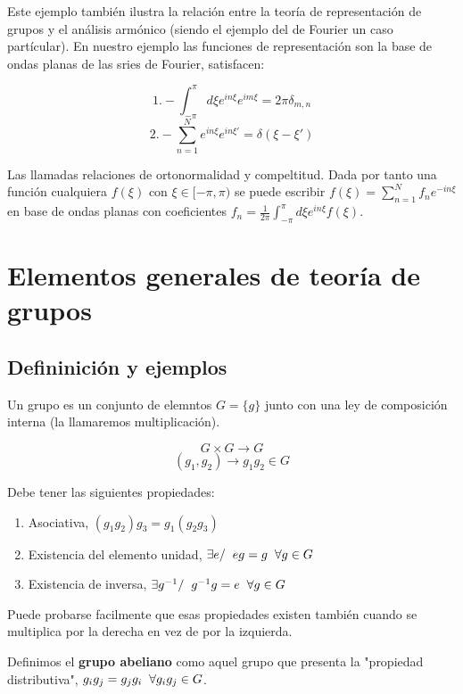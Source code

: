 \documentclass{article}
\begin{document}
\smallskip
Este ejemplo también ilustra la relación entre la teoría de representación de grupos y el análisis armónico (siendo el ejemplo del de Fourier un caso partícular). En nuestro ejemplo las funciones de representación son la base de ondas planas de las sries de Fourier, satisfacen:

$$1.- \int ^\pi _{-\pi} d\xi e^{in\xi} e^{im\xi} =2\pi \delta _{m,n}$$
$$2.- \sum _{n=1}^N e^{in\xi}e^{in\xi '}=\delta (\xi-\xi ')$$

Las llamadas relaciones de ortonormalidad y compeltitud. Dada por tanto una función cualquiera $f(\xi)$ con $\xi \in [-\pi,\pi)$ se puede escribir $f(\xi)=\sum _{n=1}^N f_ne^{-in\xi}$ en base de ondas planas con coeficientes $f_n=\frac{1}{2\pi}\int^\pi _{-\pi}d\xi e^{in\xi}f(\xi)$.






\newpage

\section{Elementos generales de teoría de grupos}
\subsection{Defininición y ejemplos}
Un grupo es un conjunto de elemntos $G=\lbrace g\rbrace$ junto con una ley de composición interna (la llamaremos multiplicación).

$$G\times G\rightarrow G$$
$$(g_1,g_2)\rightarrow g_1g_2 \in G$$

Debe tener las siguientes propiedades:

\begin{enumerate}
    \item Asociativa, $ (g_1g_2)g_3=g_1(g_2g_3)$
    \item Existencia del elemento unidad, $\exists e / \hspace{0.2cm} eg=g\hspace{0.2cm} \forall g\in G$
    \item Existencia de inversa, $\exists g^{-1} / \hspace{0.2cm} g^{-1}g=e \hspace{0.2cm} \forall g\in G$
\end{enumerate}

Puede probarse facilmente que esas propiedades existen también cuando se multiplica por la derecha en vez de por la izquierda. 

\smallskip
Definimos el \textbf{grupo abeliano} como aquel grupo que presenta la "propiedad distributiva", $g_ig_j=g_jg_i \hspace{0.2cm} \forall g_ig_j \in G$.
\end{document}

